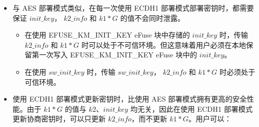 \documentclass[main\_\_CN.tex]{subfiles}
\begin{document}
\begin{itemize}
\begin{itemize}
    \end{itemize}
    \item 与 AES 部署模式类似，在每一次使用 ECDH1 部署模式部署密钥时，都需要保证 \hyperref[para:initkey]{\begin{math}init\_key\end{math}}， \hyperref[para:k2info]{\begin{math}k2\_info\end{math}} 和 \hyperref[para:k1G]{\begin{math}k1*G\end{math}} 的值不会同时泄露。
    \begin{itemize}
        \item 在使用 EFUSE\_KM\_INIT\_KEY eFuse 块中存储的 \hyperref[para:initkey]{\begin{math}init\_key\end{math}} 时，传输 \hyperref[para:k2info]{\begin{math}k2\_info\end{math}} 和 \hyperref[para:k1G]{\begin{math}k1*G\end{math}} 时可以处于不可信环境。但这意味着用户必须在本地保留第一次写入 EFUSE\_KM\_INIT\_KEY eFuse 块中的 \hyperref[para:initkey]{\begin{math}init\_key\end{math}}。
        \item 在使用 \begin{math}sw\_init\_key\end{math} 时，传输 \begin{math}sw\_init\_key\end{math}， \hyperref[para:k2info]{\begin{math}k2\_info\end{math}} 和 \hyperref[para:k1G]{\begin{math}k1*G\end{math}} 时必须处于可信环境。
    \end{itemize}
    \item 使用 ECDH1 部署模式更新密钥时，比使用 AES 部署模式拥有更高的安全性能。由于 \hyperref[para:k1G]{\begin{math}k1*G\end{math}} 的值与 \hyperref[para:k2]{\begin{math}k2\end{math}}、\hyperref[para:initkey]{\begin{math}init\_key\end{math}} 均无关，因此在使用 ECDH1 部署模式更新协商密钥时，可以只更新 \hyperref[para:k2info]{\begin{math}k2\_info\end{math}}，而不更新 \hyperref[para:k1G]{\begin{math}k1*G\end{math}}。用户可以：

\end{itemize}
\end{document}
